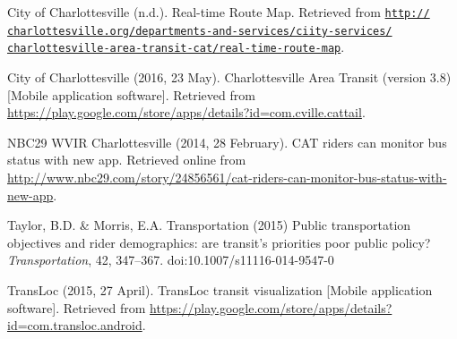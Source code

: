 \documentclass[12pt,letterpaper]{article}
\begin{document}
City of Charlottesville (n.d.). Real-time Route Map. Retrieved from \href{http://www.charlottesville.org/departments-and-services/city-services/charlottesville-area-transit-cat/real-time-route-map}{\tt http:// \\
charlottesville.org/departments-and-services/ciity-services/ \\
charlottesville-area-transit-cat/real-time-route-map}.

City of Charlottesville (2016, 23 May). Charlottesville Area Transit (version 3.8) [Mobile application software]. Retrieved from \url{https://play.google.com/store/apps/details?id=com.cville.cattail}.

NBC29 WVIR Charlottesville (2014, 28 February). CAT riders can monitor bus status with new app. Retrieved online from \url{http://www.nbc29.com/story/24856561/cat-riders-can-monitor-bus-status-with-new-app}.

Taylor, B.D. \& Morris, E.A. Transportation (2015) Public transportation objectives and rider demographics:
are transit’s priorities poor public policy? \emph{Transportation}, 42, 347--367. doi:10.1007/s11116-014-9547-0

TransLoc (2015, 27 April). TransLoc transit visualization [Mobile application software]. Retrieved from \url{https://play.google.com/store/apps/details?id=com.transloc.android}.
\end{document}
